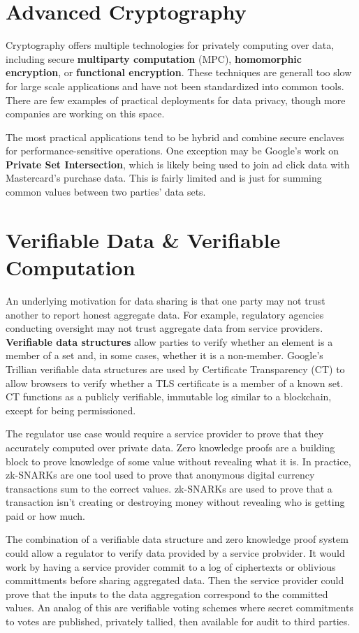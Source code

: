 \documentclass[nobib]{tufte-handout}
\begin{document}
\section{Advanced Cryptography}

Cryptography offers multiple technologies for privately computing over data,
including secure \textbf{multiparty computation} (MPC), \textbf{homomorphic
encryption}, or \textbf{functional encryption}. These techniques are generall
too slow for large scale applications and have not been standardized into common
tools. There are few examples of practical deployments for data privacy, though
more companies are working on this space.

The most practical applications tend to be hybrid and combine secure enclaves
for performance-sensitive operations. One exception may be Google’s work on
\textbf{Private Set Intersection}, which is likely being used to join ad click
data with Mastercard’s purchase data. This is fairly limited and is just for
summing common values between two parties’ data sets.

\section{Verifiable Data \& Verifiable Computation}

An underlying motivation for data sharing is that one party may not trust
another to report honest aggregate data. For example, regulatory agencies
conducting oversight may not trust aggregate data from service providers.
\textbf{Verifiable data structures} allow parties to verify whether an element
is a member of a set and, in some cases, whether it is a non-member. Google’s
Trillian verifiable data structures are used by Certificate Transparency (CT) to
allow browsers to verify whether a TLS certificate is a member of a known set.
CT functions as a publicly verifiable, immutable log similar to a blockchain,
except for being permissioned.

The regulator use case would require a service provider to prove that they
accurately computed over private data. Zero knowledge proofs are a building
block to prove knowledge of some value without revealing what it is. In
practice, zk-SNARKs are one tool used to prove that anonymous digital currency
transactions sum to the correct values. zk-SNARKs are used to prove that a
transaction isn’t creating or destroying money without revealing who is getting
paid or how much.

The combination of a verifiable data structure and zero knowledge proof system
could allow a regulator to verify data provided by a service probvider. It would
work by having a service provider commit to a log of ciphertexts or oblivious
committments before sharing aggregated data. Then the service provider could
prove that the inputs to the data aggregation correspond to the committed
values. An analog of this are verifiable voting schemes where secret commitments
to votes are published, privately tallied, then available for audit to third
parties.

 
\end{document}
